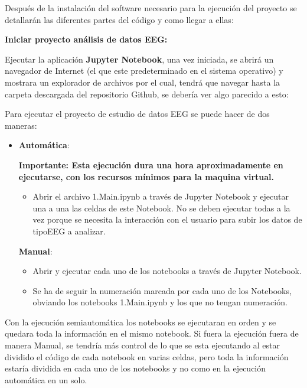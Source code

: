Después de la instalación del software necesario para la ejecución del proyecto se detallarán las diferentes partes del código y como llegar a ellas:


\textbf{Iniciar proyecto análisis de datos EEG:}

Ejecutar la aplicación \textbf{Jupyter Notebook}, una vez iniciada, se abrirá un navegador de Internet (el que este predeterminado en el sistema operativo) y mostrara un explorador de archivos por el cual, tendrá que navegar hasta la carpeta descargada del repositorio Github, se debería ver algo parecido a esto:




Para ejecutar el proyecto de estudio de datos EEG se puede hacer de dos maneras:

  \begin{itemize}

   \item
    \textbf{Automática}: 
    
	\textbf{Importante: Esta ejecución dura una hora aproximadamente en ejecutarse, con los recursos mínimos para la maquina virtual.}    
    
    \begin{itemize}


   \item
    Abrir el archivo 1.Main.ipynb a través de Jupyter Notebook y ejecutar una a una las celdas de este Notebook. No se deben ejecutar todas a la vez porque se necesita la interacción con el usuario para subir los datos de tipoEEG a analizar.
   \end{itemize}

    \textbf{Manual}: 
  \begin{itemize}
   \tightlist
   \item
    Abrir y ejecutar cada uno de los notebooks a través de Jupyter Notebook. 
   \item
    Se ha de seguir la numeración marcada por cada uno de los Notebooks, obviando los notebooks 1.Main.ipynb y los que no tengan numeración.
   \end{itemize}   
  \end{itemize} 
 

Con la ejecución semiautomática los notebooks se ejecutaran en orden y se quedara toda la información en el mismo notebook.
Si fuera la ejecución fuera de manera Manual, se tendría más control de lo que se esta ejecutando al estar dividido el código de cada notebook en varias celdas, pero toda la información estaría dividida en cada uno de los notebooks y no como en la ejecución automática en un solo.


